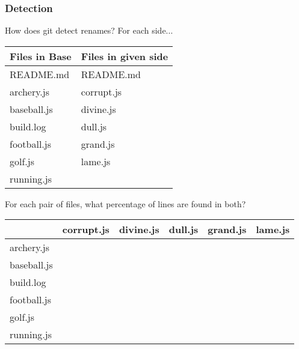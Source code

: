 \documentclass[compress,t]{beamer}
\begin{document}
\begin{frame}
  \frametitle{Detection}

  How does git detect renames?  For each side...\\[0.25em]
  \pause
  \vspace*{-1.0\baselineskip}
  \begin{center}
    {\footnotesize
    \begin{tabular}{l|l}
      Files in Base  &  Files in given side \\
      \hline
      README.md      &  README.md   \\
      archery.js     &  corrupt.js  \\
      baseball.js    &  divine.js   \\
      build.log      &  dull.js     \\
      football.js    &  grand.js    \\
      golf.js        &  lame.js     \\
      running.js     &
    \end{tabular}
    }
  \end{center}
  \vspace*{-1.5\baselineskip}

  \pause
  \vspace*{\baselineskip}
  For each pair of files, what percentage of lines are found in both?
  \pause
  \vspace*{-0.25\baselineskip}
  \begin{center}
    {\footnotesize
    \begin{tabular}{l|l|l|l|l|l}
                   & corrupt.js & divine.js & dull.js & grand.js & lame.js \\
      \hline
      archery.js   &&&&& \\
      baseball.js  &&&&& \\
      build.log    &&&&& \\
      football.js  &&&&& \\
      golf.js      &&&&& \\
      running.js   &&&&&
    \end{tabular}
    }
  \end{center}

\end{frame}

\begin{comment}
  blind
  boring
  lame
  rewarding
  corrupt

  archery
  baseball
  football
  golf
  running
\end{comment}
\end{document}
